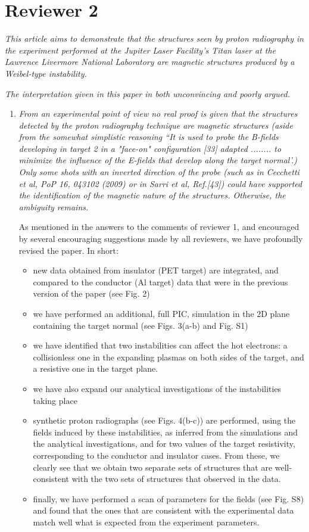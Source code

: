 \documentclass{article}
\begin{document}
\section{Reviewer 2}

\textit{This article aims to demonstrate that the structures seen by proton radiography in the experiment performed at the Jupiter Laser Facility's Titan laser at the Lawrence Livermore National Laboratory are magnetic structures produced by a Weibel-type instability.}

\textit{
The interpretation given in this paper in both unconvincing and poorly argued.}
\begin{enumerate}
\item \textit{From an experimental point of view no real proof is given that the structures detected by the proton radiography technique are magnetic structures (aside from the somewhat simplistic reasoning ``It is used to probe the B-fields developing in target 2 in a "face-on" configuration [33] adapted ........ to minimize the influence of the E-fields that develop along the target normal'.)
Only some shots with an inverted direction of the probe (such as in Cecchetti et al, PoP 16, 043102 (2009) or in Sarri et al, Ref.[43]) could have supported the identification of the magnetic nature of the structures. Otherwise, the ambiguity remains. }


As mentioned in the answers to the comments of reviewer 1, and encouraged by several encouraging suggestions made by all reviewers, we have profoundly revised the paper. In short:
\begin{itemize}
    \item new data obtained from insulator (PET target) are integrated, and compared to the conductor (Al target) data that were in the previous version of the paper (see Fig. 2)
    \item we have performed an additional, full PIC, simulation in the 2D plane containing the target normal (see Figs. 3(a-b) and Fig. S1)
    \item we have identified that two instabilities can affect the hot electrons: a collisionless one in the expanding plasmas on both sides of the target, and a resistive one in the target plane. 
    \item we have also expand our analytical investigations of the instabilities taking place
    \item synthetic proton radiographs (see Figs. 4(b-c)) are performed, using the fields induced by these instabilities, as inferred from the simulations and the analytical investigations, and for two values of the target resistivity, corresponding to the conductor and insulator cases. From these, we clearly see that we obtain two separate sets of structures that are well-consistent with the two sets of structures that observed in the data. 
    \item finally, we have performed a scan of parameters for the fields (see Fig. S8) and found that the ones that are consistent with the experimental data match well what is expected from the experiment parameters. 
\end{itemize}


\end{enumerate}
\end{document}
